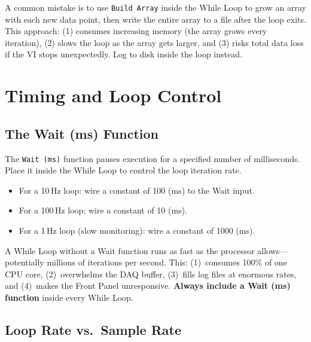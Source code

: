\begin{warningbox}
A common mistake is to use \texttt{Build Array} inside the While Loop to grow an array with each new data point, then write the entire array to a file after the loop exits. This approach: (1) consumes increasing memory (the array grows every iteration), (2) slows the loop as the array gets larger, and (3) risks total data loss if the VI stops unexpectedly. Log to disk inside the loop instead.
\end{warningbox}

\section{Timing and Loop Control}
\label{sec:lv_timing}

\subsection{The Wait (ms) Function}

The \texttt{Wait (ms)} function pauses execution for a specified number of milliseconds. Place it inside the While Loop to control the loop iteration rate.

\begin{itemize}[nosep,leftmargin=1.5em]
\item For a 10\,Hz loop: wire a constant of 100 (ms) to the Wait input.
\item For a 100\,Hz loop: wire a constant of 10 (ms).
\item For a 1\,Hz loop (slow monitoring): wire a constant of 1000 (ms).
\end{itemize}

\begin{warningbox}
A While Loop without a Wait function runs as fast as the processor allows---potentially millions of iterations per second. This: (1)~consumes 100\% of one CPU core, (2)~overwhelms the DAQ buffer, (3)~fills log files at enormous rates, and (4)~makes the Front Panel unresponsive. \textbf{Always include a Wait (ms) function} inside every While Loop.
\end{warningbox}

\subsection{Loop Rate vs.\ Sample Rate}

